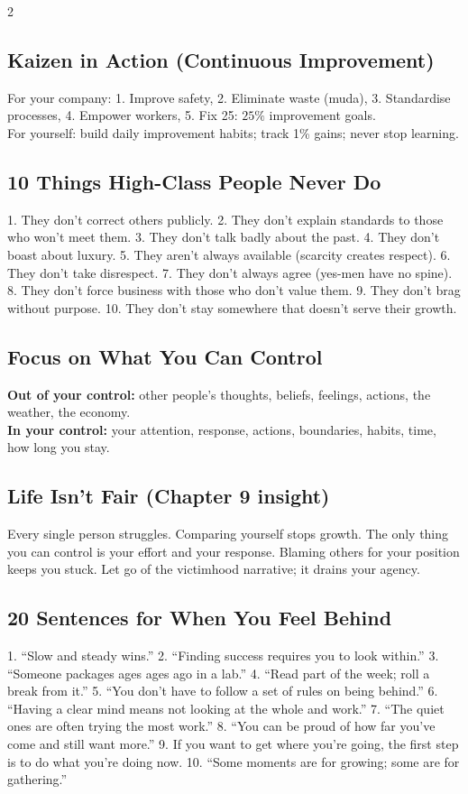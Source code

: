 \documentclass[10pt,a4paper]{article}
\begin{document}
\begin{multicols}{2}
\subsection{Kaizen in Action (Continuous Improvement)}
For your company: 1. Improve safety, 2. Eliminate waste (muda), 3. Standardise processes, 4. Empower workers, 5. Fix 25: $25\%$ improvement goals.\\
For yourself: build daily improvement habits; track 1\% gains; never stop learning.

\subsection{10 Things High-Class People Never Do}
1. They don't correct others publicly. 2. They don't explain standards to those who won't meet them. 3. They don't talk badly about the past. 4. They don't boast about luxury. 5. They aren't always available (scarcity creates respect). 6. They don't take disrespect. 7. They don't always agree (yes-men have no spine). 8. They don't force business with those who don't value them. 9. They don't brag without purpose. 10. They don't stay somewhere that doesn't serve their growth.

\subsection{Focus on What You Can Control}
\textbf{Out of your control:} other people's thoughts, beliefs, feelings, actions, the weather, the economy.\\
\textbf{In your control:} your attention, response, actions, boundaries, habits, time, how long you stay.

\subsection{Life Isn't Fair (Chapter 9 insight)}
Every single person struggles. Comparing yourself stops growth. The only thing you can control is your effort and your response. Blaming others for your position keeps you stuck. Let go of the victimhood narrative; it drains your agency.

\subsection{20 Sentences for When You Feel Behind}
1. ``Slow and steady wins.''  2. ``Finding success requires you to look within.'' 3. ``Someone packages ages ages ago in a lab.'' 4. ``Read part of the week; roll a break from it.'' 5. ``You don't have to follow a set of rules on being behind.'' 6. ``Having a clear mind means not looking at the whole and work.'' 7. ``The quiet ones are often trying the most work.'' 8. ``You can be proud of how far you've come and still want more.'' 9. If you want to get where you're going, the first step is to do what you're doing now. 10. ``Some moments are for growing; some are for gathering.''


\end{multicols}
\end{document}
